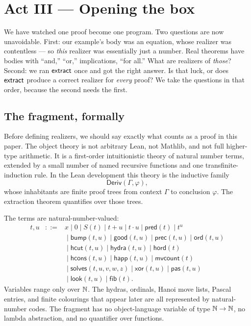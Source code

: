 \documentclass[11pt]{article}
\begin{document}
\section{Act III --- Opening the box}

We have watched one proof become one program. Two questions are now
unavoidable. First: our example's body was an equation, whose realizer was
contentless --- so \emph{this} realizer was essentially just a number. Real
theorems have bodies with ``and,'' ``or,'' implications, ``for all.'' What
are realizers of \emph{those}? Second: we ran $\mathsf{extract}$ once and got the
right answer. Is that luck, or does $\mathsf{extract}$ produce a correct realizer for
\emph{every} proof? We take the questions in that order, because the second
needs the first.

\subsection*{The fragment, formally}

Before defining realizers, we should say exactly what counts as a proof in
this paper. The object theory is not arbitrary Lean, not Mathlib, and not full
higher-type arithmetic. It is a first-order intuitionistic theory of natural
number terms, extended by a small number of named recursive functions and one
transfinite-induction rule. In the Lean development this theory is the
inductive family
\[
  \mathsf{Deriv}(\Gamma,\varphi),
\]
whose inhabitants are finite proof trees from context $\Gamma$ to conclusion
$\varphi$. The extraction theorem quantifies over those trees.

The terms are natural-number-valued:
\[
\begin{array}{rcl}
t,u &::=& x \mid 0 \mid S(t) \mid t+u \mid t\cdot u
      \mid \mathsf{pred}(t) \mid t^u                                          \\
    && {}\mid \mathsf{bump}(t,u) \mid \mathsf{good}(t,u)
      \mid \mathsf{prec}(t,u) \mid \mathsf{ord}(t,u)                          \\
    && {}\mid \mathsf{hcut}(t,u) \mid \mathsf{hydra}(t,u)
      \mid \mathsf{hord}(t)                                                    \\
    && {}\mid \mathsf{hcons}(t,u) \mid \mathsf{happ}(t,u)
      \mid \mathsf{mvcount}(t)                                                 \\
    && {}\mid \mathsf{solves}(t,u,v,w,z) \mid \mathsf{xor}(t,u)
      \mid \mathsf{pas}(t,u)                                                   \\
    && {}\mid \mathsf{look}(t,u) \mid \mathsf{fib}(t).
\end{array}
\]
Variables range only over $\mathbb{N}$. The hydras, ordinals, Hanoi move lists,
Pascal entries, and finite colourings that appear later are all represented
by natural-number codes. The fragment has no object-language variable of type
$\mathbb{N}\to\mathbb{N}$, no lambda abstraction, and no quantifier over functions.
\end{document}

